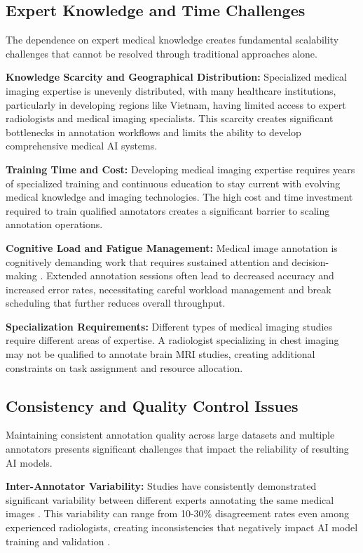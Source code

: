 \subsection{Expert Knowledge and Time Challenges}

The dependence on expert medical knowledge creates fundamental scalability challenges that cannot be resolved through traditional approaches alone.

\textbf{Knowledge Scarcity and Geographical Distribution:} Specialized medical imaging expertise is unevenly distributed, with many healthcare institutions, particularly in developing regions like Vietnam, having limited access to expert radiologists and medical imaging specialists. This scarcity creates significant bottlenecks in annotation workflows and limits the ability to develop comprehensive medical AI systems.

\textbf{Training Time and Cost:} Developing medical imaging expertise requires years of specialized training and continuous education to stay current with evolving medical knowledge and imaging technologies. The high cost and time investment required to train qualified annotators creates a significant barrier to scaling annotation operations.

\textbf{Cognitive Load and Fatigue Management:} Medical image annotation is cognitively demanding work that requires sustained attention and decision-making \cite{drew2013invisible}. Extended annotation sessions often lead to decreased accuracy and increased error rates, necessitating careful workload management and break scheduling that further reduces overall throughput.

\textbf{Specialization Requirements:} Different types of medical imaging studies require different areas of expertise. A radiologist specializing in chest imaging may not be qualified to annotate brain MRI studies, creating additional constraints on task assignment and resource allocation.

\subsection{Consistency and Quality Control Issues}

Maintaining consistent annotation quality across large datasets and multiple annotators presents significant challenges that impact the reliability of resulting AI models.

\textbf{Inter-Annotator Variability:} Studies have consistently demonstrated significant variability between different experts annotating the same medical images \cite{kappa2016inter}. This variability can range from 10-30\% disagreement rates even among experienced radiologists, creating inconsistencies that negatively impact AI model training and validation \cite{sheng2008get}.

